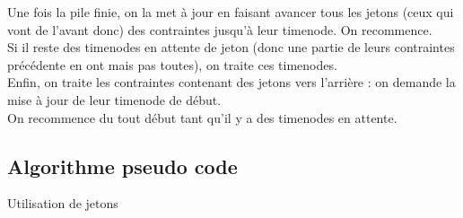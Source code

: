 \documentclass[10pt,a4paper]{article}
\begin{document}
Une fois la pile finie, on la met à jour en faisant avancer tous les jetons (ceux qui vont de l'avant donc) des contraintes jusqu'à leur timenode. On recommence. \\

Si il reste des timenodes en attente de jeton (donc une partie de leurs contraintes précédente en ont mais pas toutes), on traite ces timenodes.\\

Enfin, on traite les contraintes contenant des jetons vers l'arrière : on demande la mise à jour de leur timenode de début.\\

On recommence du tout début tant qu'il y a des timenodes en attente.


	\subsection{Algorithme pseudo code}

Utilisation de jetons
\end{document}
